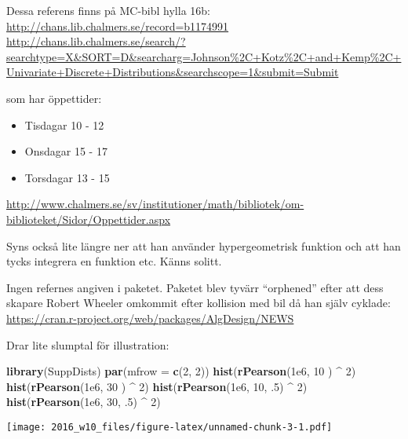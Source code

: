 \documentclass[]{article}
\newenvironment{Shaded}{\begin{snugshade}}{\end{snugshade}}
\newcommand{\KeywordTok}[1]{\textcolor[rgb]{0.13,0.29,0.53}{\textbf{{#1}}}}
\newcommand{\DataTypeTok}[1]{\textcolor[rgb]{0.13,0.29,0.53}{{#1}}}
\newcommand{\DecValTok}[1]{\textcolor[rgb]{0.00,0.00,0.81}{{#1}}}
\newcommand{\FloatTok}[1]{\textcolor[rgb]{0.00,0.00,0.81}{{#1}}}
\newcommand{\StringTok}[1]{\textcolor[rgb]{0.31,0.60,0.02}{{#1}}}
\newcommand{\NormalTok}[1]{{#1}}
\providecommand{\tightlist}{%
  \setlength{\itemsep}{0pt}\setlength{\parskip}{0pt}}
\begin{document}
Dessa referens finns på MC-bibl hylla 16b:
\url{http://chans.lib.chalmers.se/record=b1174991}
\url{http://chans.lib.chalmers.se/search/?searchtype=X\&SORT=D\&searcharg=Johnson\%2C+Kotz\%2C+and+Kemp\%2C+Univariate+Discrete+Distributions\&searchscope=1\&submit=Submit}

som har öppettider:

\begin{itemize}
\tightlist
\item
  Tisdagar 10 - 12
\item
  Onsdagar 15 - 17
\item
  Torsdagar 13 - 15
\end{itemize}

\url{http://www.chalmers.se/sv/institutioner/math/bibliotek/om-biblioteket/Sidor/Oppettider.aspx}

Syns också lite längre ner att han använder hypergeometrisk funktion och
att han tycks integrera en funktion etc. Känns solitt.

Ingen refernes angiven i paketet. Paketet blev tyvärr ``orphened'' efter
att dess skapare Robert Wheeler omkommit efter kollision med bil då han
själv cyklade:
\url{https://cran.r-project.org/web/packages/AlgDesign/NEWS}

Drar lite slumptal för illustration:

\begin{Shaded}
\begin{Highlighting}[]
\KeywordTok{library}\NormalTok{(SuppDists)}
\KeywordTok{par}\NormalTok{(}\DataTypeTok{mfrow =} \KeywordTok{c}\NormalTok{(}\DecValTok{2}\NormalTok{, }\DecValTok{2}\NormalTok{))}
\KeywordTok{hist}\NormalTok{(}\KeywordTok{rPearson}\NormalTok{(}\FloatTok{1e6}\NormalTok{, }\DecValTok{10}    \NormalTok{) ^}\StringTok{ }\DecValTok{2}\NormalTok{)}
\KeywordTok{hist}\NormalTok{(}\KeywordTok{rPearson}\NormalTok{(}\FloatTok{1e6}\NormalTok{, }\DecValTok{30}    \NormalTok{) ^}\StringTok{ }\DecValTok{2}\NormalTok{)}
\KeywordTok{hist}\NormalTok{(}\KeywordTok{rPearson}\NormalTok{(}\FloatTok{1e6}\NormalTok{, }\DecValTok{10}\NormalTok{, .}\DecValTok{5}\NormalTok{) ^}\StringTok{ }\DecValTok{2}\NormalTok{)}
\KeywordTok{hist}\NormalTok{(}\KeywordTok{rPearson}\NormalTok{(}\FloatTok{1e6}\NormalTok{, }\DecValTok{30}\NormalTok{, .}\DecValTok{5}\NormalTok{) ^}\StringTok{ }\DecValTok{2}\NormalTok{)}
\end{Highlighting}
\end{Shaded}

\texttt{[image: 2016\_w10\_files/figure-latex/unnamed-chunk-3-1.pdf]}
\end{document}
